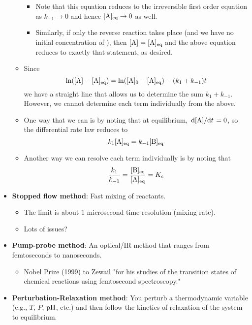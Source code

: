 \documentclass[../notes.tex]{subfiles}
\begin{document}
\begin{itemize}
\begin{itemize}
        \begin{itemize}
            \item Note that this equation reduces to the irreversible first order equation as $k_{-1}\to 0$ and hence $[\ce{A}]_\text{eq}\to 0$ as well.
            \item Similarly, if only the reverse reaction takes place (and we have no initial concentration of ), then $[\ce{A}]=[\ce{A}]_\text{eq}$ and the above equation reduces to exactly that statement, as desired.
        \end{itemize}
        \item Since
        \begin{equation*}
            \ln([\ce{A}]-[\ce{A}]_\text{eq}) = \ln([\ce{A}]_0-[\ce{A}]_\text{eq})-(k_1+k_{-1})t
        \end{equation*}
        we have a straight line that allows us to determine the sum $k_1+k_{-1}$. However, we cannot determine each term individually from the above.
        \item One way that we can is by noting that at equilibrium, $\dv*{[\ce{A}]}{t}=0$, so the differential rate law reduces to
        \begin{equation*}
            k_1[\ce{A}]_\text{eq} = k_{-1}[\ce{B}]_\text{eq}
        \end{equation*}
        \item Another way we can resolve each term individually is by noting that
        \begin{equation*}
            \frac{k_1}{k_{-1}} = \frac{[\ce{B}]_\text{eq}}{[\ce{A}]_\text{eq}}
            = K_c
        \end{equation*}
    \end{itemize}
    \item \textbf{Stopped flow method}: Fast mixing of reactants.
    \begin{itemize}
        \item The limit is about 1 microsecond time resolution (mixing rate).
        \item Lots of issues?
    \end{itemize}
    \item \textbf{Pump-probe method}: An optical/IR method that ranges from femtoseconds to nanoseconds.
    \begin{itemize}
        \item Nobel Prize (1999) to Zewail "for his studies of the transition states of chemical reactions using femtosecond spectroscopy."
    \end{itemize}
    \item \textbf{Perturbation-Relaxation method}: You perturb a thermodynamic variable (e.g., $T$, $P$, $\operatorname{pH}$, etc.) and then follow the kinetics of relaxation of the system to equilibrium.
    \begin{figure}[H]
        \centering
\end{figure}
\end{itemize}
\end{document}
